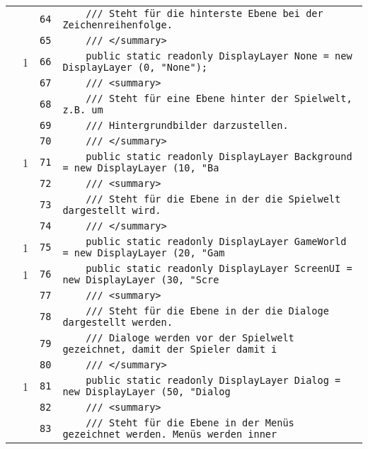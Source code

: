 \documentclass[a4paper,10pt]{article}
\begin{document}
\begin{longtable}[l]{lrrl}
\cellcolor{gray} &  & \verb~64~ & \verb~    /// Steht für die hinterste Ebene bei der Zeichenreihenfolge.~\\
\cellcolor{gray} &  & \verb~65~ & \verb~    /// </summary>~\\
\cellcolor{green} & 1 & \verb~66~ & \verb~    public static readonly DisplayLayer None = new DisplayLayer (0, "None");~\\
\cellcolor{gray} &  & \verb~67~ & \verb~    /// <summary>~\\
\cellcolor{gray} &  & \verb~68~ & \verb~    /// Steht für eine Ebene hinter der Spielwelt, z.B. um~\\
\cellcolor{gray} &  & \verb~69~ & \verb~    /// Hintergrundbilder darzustellen.~\\
\cellcolor{gray} &  & \verb~70~ & \verb~    /// </summary>~\\
\cellcolor{green} & 1 & \verb~71~ & \verb~    public static readonly DisplayLayer Background = new DisplayLayer (10, "Ba~\\
\cellcolor{gray} &  & \verb~72~ & \verb~    /// <summary>~\\
\cellcolor{gray} &  & \verb~73~ & \verb~    /// Steht für die Ebene in der die Spielwelt dargestellt wird.~\\
\cellcolor{gray} &  & \verb~74~ & \verb~    /// </summary>~\\
\cellcolor{green} & 1 & \verb~75~ & \verb~    public static readonly DisplayLayer GameWorld = new DisplayLayer (20, "Gam~\\
\cellcolor{green} & 1 & \verb~76~ & \verb~    public static readonly DisplayLayer ScreenUI = new DisplayLayer (30, "Scre~\\
\cellcolor{gray} &  & \verb~77~ & \verb~    /// <summary>~\\
\cellcolor{gray} &  & \verb~78~ & \verb~    /// Steht für die Ebene in der die Dialoge dargestellt werden.~\\
\cellcolor{gray} &  & \verb~79~ & \verb~    /// Dialoge werden vor der Spielwelt gezeichnet, damit der Spieler damit i~\\
\cellcolor{gray} &  & \verb~80~ & \verb~    /// </summary>~\\
\cellcolor{green} & 1 & \verb~81~ & \verb~    public static readonly DisplayLayer Dialog = new DisplayLayer (50, "Dialog~\\
\cellcolor{gray} &  & \verb~82~ & \verb~    /// <summary>~\\
\cellcolor{gray} &  & \verb~83~ & \verb~    /// Steht für die Ebene in der Menüs gezeichnet werden. Menüs werden inner~\\

\end{longtable}
\end{document}
